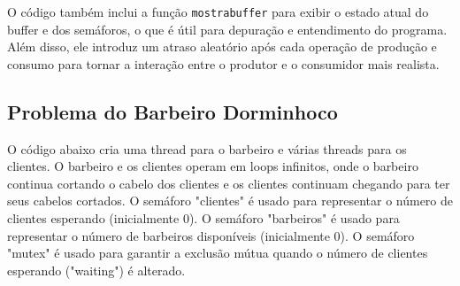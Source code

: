 \documentclass[10pt]{article}
\begin{document}
O código também inclui a função \verb|mostrabuffer| para exibir o estado atual do buffer e dos semáforos, o que é útil para depuração e entendimento do programa. Além disso, ele introduz um atraso aleatório após cada operação de produção e consumo para tornar a interação entre o produtor e o consumidor mais realista.
\subsection{Problema do Barbeiro Dorminhoco}
O código abaixo cria uma thread para o barbeiro e várias threads para os clientes.
O barbeiro e os clientes operam em loops infinitos, onde o barbeiro continua cortando o cabelo
dos clientes e os clientes continuam chegando para ter seus cabelos cortados. O semáforo "clientes"
é usado para representar o número de clientes esperando (inicialmente 0). O semáforo "barbeiros"
é usado para representar o número de barbeiros disponíveis (inicialmente 0). O semáforo "mutex" é
usado para garantir a exclusão mútua quando o número de clientes esperando ("waiting") é alterado.
\end{document}
